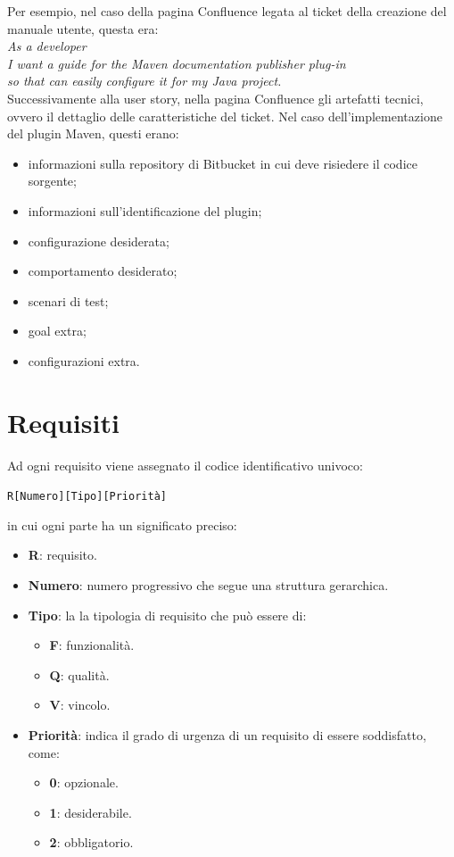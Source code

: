Per esempio, nel caso della pagina Confluence legata al ticket della creazione del manuale utente, questa era: \\
\emph{As a developer \\
I want a guide for the Maven documentation publisher plug-in \\
so that can easily configure it for my Java project.} \\
Successivamente alla user story, nella pagina Confluence  gli artefatti tecnici, ovvero il dettaglio delle caratteristiche del ticket.
Nel caso dell'implementazione del plugin Maven, questi erano:
\begin{itemize}
	\item informazioni sulla repository di Bitbucket in cui deve risiedere il codice sorgente;
	\item informazioni sull'identificazione del plugin;
	\item configurazione desiderata;
	\item comportamento desiderato;
	\item scenari di test;
	\item goal extra;
	\item configurazioni extra.
\end{itemize}


\clearpage

\section{Requisiti}	\label{requisiti}
Ad ogni requisito viene assegnato il codice identificativo univoco:
	\begin{center}
		\texttt{R[Numero][Tipo][Priorità]}
	\end{center}
	in cui ogni parte ha un significato preciso:
	\begin{itemize}
		\item \textbf{R}: requisito.
		\item \textbf{Numero}: numero progressivo che segue una struttura gerarchica.
		\item \textbf{Tipo}: la la tipologia di requisito che può essere di:
		\begin{itemize}
			\item \textbf{F}: funzionalità.
			\item \textbf{Q}: qualità.
			\item \textbf{V}: vincolo.
		\end{itemize}
		\item \textbf{Priorità}: indica il grado di urgenza di un requisito di essere soddisfatto, come:
		\begin{itemize}
			\item \textbf{0}: opzionale.
			\item \textbf{1}: desiderabile.
			\item \textbf{2}: obbligatorio.
		\end{itemize}
	\end{itemize}

